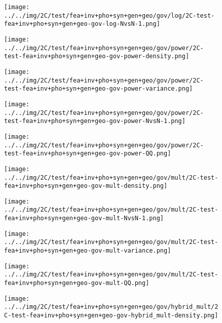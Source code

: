 \begin{figure}[H]
\centering	\texttt{[image: ../../img/2C/test/fea+inv+pho+syn+gen+geo/gov/log/2C-test-fea+inv+pho+syn+gen+geo-gov-log-NvsN-1.png]}
\end{figure}
\begin{figure}[H]
\centering	\texttt{[image: ../../img/2C/test/fea+inv+pho+syn+gen+geo/gov/power/2C-test-fea+inv+pho+syn+gen+geo-gov-power-density.png]}
\end{figure}
\begin{figure}[H]
\centering	\texttt{[image: ../../img/2C/test/fea+inv+pho+syn+gen+geo/gov/power/2C-test-fea+inv+pho+syn+gen+geo-gov-power-variance.png]}
\end{figure}
\begin{figure}[H]
\centering	\texttt{[image: ../../img/2C/test/fea+inv+pho+syn+gen+geo/gov/power/2C-test-fea+inv+pho+syn+gen+geo-gov-power-NvsN-1.png]}
\end{figure}
\begin{figure}[H]
\centering	\texttt{[image: ../../img/2C/test/fea+inv+pho+syn+gen+geo/gov/power/2C-test-fea+inv+pho+syn+gen+geo-gov-power-QQ.png]}
\end{figure}
\begin{figure}[H]
\centering	\texttt{[image: ../../img/2C/test/fea+inv+pho+syn+gen+geo/gov/mult/2C-test-fea+inv+pho+syn+gen+geo-gov-mult-density.png]}
\end{figure}
\begin{figure}[H]
\centering	\texttt{[image: ../../img/2C/test/fea+inv+pho+syn+gen+geo/gov/mult/2C-test-fea+inv+pho+syn+gen+geo-gov-mult-NvsN-1.png]}
\end{figure}
\begin{figure}[H]
\centering	\texttt{[image: ../../img/2C/test/fea+inv+pho+syn+gen+geo/gov/mult/2C-test-fea+inv+pho+syn+gen+geo-gov-mult-variance.png]}
\end{figure}
\begin{figure}[H]
\centering	\texttt{[image: ../../img/2C/test/fea+inv+pho+syn+gen+geo/gov/mult/2C-test-fea+inv+pho+syn+gen+geo-gov-mult-QQ.png]}
\end{figure}
\begin{figure}[H]
\centering	\texttt{[image: ../../img/2C/test/fea+inv+pho+syn+gen+geo/gov/hybrid\_mult/2C-test-fea+inv+pho+syn+gen+geo-gov-hybrid\_mult-density.png]}
\end{figure}
